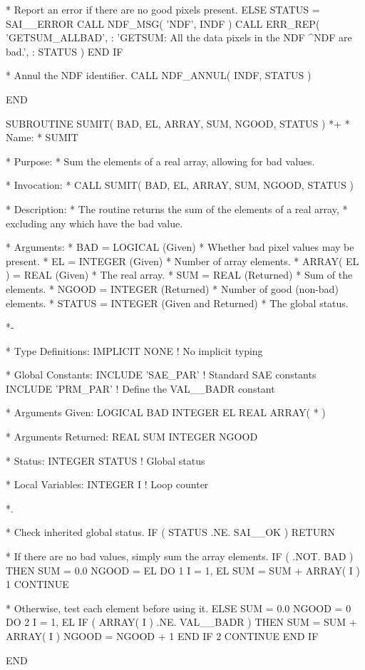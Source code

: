 \documentclass[twoside,11pt,nolof]{starlink}
\begin{document}
\begin{terminalv}
*  Report an error if there are no good pixels present.
      ELSE
         STATUS = SAI__ERROR
         CALL NDF_MSG( 'NDF', INDF )
         CALL ERR_REP( 'GETSUM_ALLBAD',
     :   'GETSUM: All the data pixels in the NDF ^NDF are bad.',
     :   STATUS )
      END IF

*  Annul the NDF identifier.
      CALL NDF_ANNUL( INDF, STATUS )

      END

      SUBROUTINE SUMIT( BAD, EL, ARRAY, SUM, NGOOD, STATUS )
*+
*  Name:
*     SUMIT

*  Purpose:
*     Sum the elements of a real array, allowing for bad values.

*  Invocation:
*     CALL SUMIT( BAD, EL, ARRAY, SUM, NGOOD, STATUS )

*  Description:
*     The routine returns the sum of the elements of a real array,
*     excluding any which have the bad value.

*  Arguments:
*     BAD = LOGICAL (Given)
*        Whether bad pixel values may be present.
*     EL = INTEGER (Given)
*        Number of array elements.
*     ARRAY( EL ) = REAL (Given)
*        The real array.
*     SUM = REAL (Returned)
*        Sum of the elements.
*     NGOOD = INTEGER (Returned)
*        Number of good (non-bad) elements.
*     STATUS = INTEGER (Given and Returned)
*        The global status.

*-

*  Type Definitions:
      IMPLICIT NONE              ! No implicit typing

*  Global Constants:
      INCLUDE 'SAE_PAR'          ! Standard SAE constants
      INCLUDE 'PRM_PAR'          ! Define the VAL__BADR constant

*  Arguments Given:
      LOGICAL BAD
      INTEGER EL
      REAL ARRAY( * )

*  Arguments Returned:
      REAL SUM
      INTEGER NGOOD

*  Status:
      INTEGER STATUS             ! Global status

*  Local Variables:
      INTEGER I                  ! Loop counter

*.

*  Check inherited global status.
      IF ( STATUS .NE. SAI__OK ) RETURN

*  If there are no bad values, simply sum the array elements.
      IF ( .NOT. BAD ) THEN
         SUM = 0.0
         NGOOD = EL
         DO 1 I = 1, EL
            SUM = SUM + ARRAY( I )
 1       CONTINUE

*  Otherwise, test each element before using it.
      ELSE
         SUM = 0.0
         NGOOD = 0
         DO 2 I = 1, EL
            IF ( ARRAY( I ) .NE. VAL__BADR ) THEN
               SUM = SUM + ARRAY( I )
               NGOOD = NGOOD + 1
            END IF
 2       CONTINUE
      END IF

      END
\end{terminalv}
\normalsize
\end{document}
